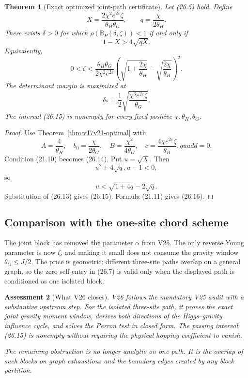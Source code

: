\documentclass[11pt]{article}
\newtheorem{theorem}{Theorem}[section]
\newtheorem{assessment}[theorem]{Assessment}
\theoremstyle{remark}
\begin{document}
\begin{theorem}[Exact optimized joint-path certificate]
\label{thm:v17v26-perron}
Let (26.5) hold.  Define
\[
 X=\frac{2\chi^2e^{2\varepsilon}\zeta}
 {\theta_H\theta_G},
 \qquad q=\frac{\chi}{2\theta_H}.                 \tag{26.13}
\]
There exists \(\delta>0\) for which
\(\rho(\mathbb B_P(\delta,\zeta))<1\) if and only if
\[
 1-X>4\sqrt{qX}.                                   \tag{26.14}
\]
Equivalently,
\[
\boxed{
 0<\zeta<
 \frac{\theta_H\theta_G}
 {2\chi^2e^{2\varepsilon}}
 \left(
 \sqrt{1+\frac{2\chi}{\theta_H}}
 -\sqrt{\frac{2\chi}{\theta_H}}
 \right)^2.}                                      \tag{26.15}
\]
The determinant margin is maximized at
\[
 \boxed{
 \delta_*=\frac12
 \sqrt{\frac{\chi^3e^{2\varepsilon}\zeta}{\theta_G}}.}       \tag{26.16}
\]
The interval (26.15) is nonempty for every fixed positive
\(\chi,\theta_H,\theta_G\).
\end{theorem}

\begin{proof}
Use Theorem~\ref{thm:v17v21-optimal} with
\[
 A=\frac4{\theta_H},\quad
 b_0=\frac\chi{2\theta_G},\quad
 B=\frac{\chi^2}{4\theta_G},\quad
 c=\frac{4\chi e^{2\varepsilon}\zeta}{\theta_H},quad
 d=0.                                              \tag{26.17}
\]
Condition (21.10) becomes (26.14).  Put \(u=\sqrt X\).  Then
\[
 u^2+4\sqrt q,u-1<0,                              \tag{26.18}
\]
so
\[
 u<\sqrt{1+4q}-2\sqrt q.                          \tag{26.19}
\]
Substitution of (26.13) gives (26.15).  Formula (21.11) gives
(26.16).
\end{proof}

\subsection{Comparison with the one-site chord scheme}

The joint block has removed the parameter \(\alpha\) from V25.  The
only reverse Young parameter is now \(\zeta\), and making it small
does not consume the gravity window \(\theta_G\leq J/2\).  The price is
geometric: different three-site paths overlap on a general graph, so
the zero self-entry in (26.7) is valid only when the displayed path is
conditioned as one isolated block.

\begin{assessment}[What V26 closes]
\label{ass:v17v26-status}
V26 follows the mandatory V25 audit with a substantive upstream step.
For the isolated three-site path, it proves the exact joint gravity
moment window, derives both directions of the Higgs--gravity influence
cycle, and solves the Perron test in closed form.  The passing interval
(26.15) is nonempty without requiring the physical hopping coefficient
to vanish.

The remaining obstruction is no longer analytic on one path.  It is
the overlap of such blocks on graph exhaustions and the boundary edges
created by any block partition.
\end{assessment}
\end{document}
